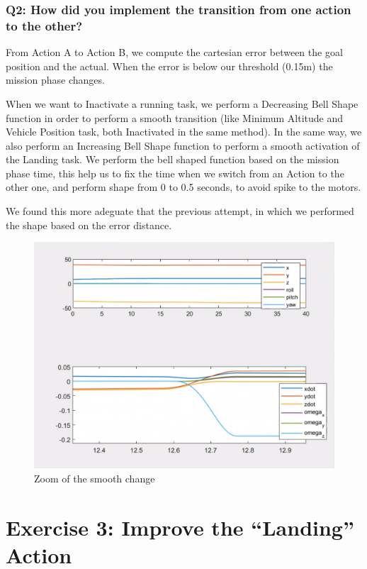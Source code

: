 \documentclass{article}
\begin{document}
\subsubsection{Q2: How did you implement the transition from one action to the other?}
From Action A to Action B, we compute the cartesian error between the goal position and the actual. When the error is below our threshold (0.15m) the mission phase changes. 

When we want to Inactivate a running task, we perform a Decreasing Bell Shape function in order to perform a smooth transition (like Minimum Altitude and Vehicle Position task, both Inactivated in the same method). In the same way, we also perform an Increasing Bell Shape function to perform a smooth activation of the Landing task. We perform the bell shaped function based on the mission phase time, this help us to fix the time when we switch from an Action to the other one, and perform shape from 0 to 0.5 seconds, to avoid spike to the motors.

We found this more adeguate that the previous attempt, in which we performed the shape based on the error distance.

\begin{figure}[hb]
    \centering
    \includegraphics[scale=0.3]{222_smooth_ppdot.png}
    \caption{Zoom of the smooth change}
    \label{images_2_3_1}
\end{figure}
 
\clearpage

\section{Exercise 3: Improve the “Landing” Action}
\end{document}
